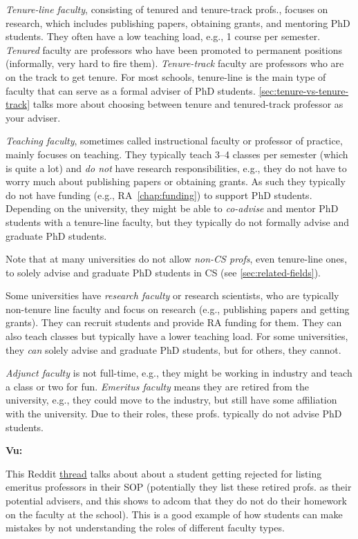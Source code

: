 \documentclass[oneside,11pt,dvipsnames]{book}
\newenvironment{commentbox}[1][]{
  \small
  \begin{mybox}
    {\small \textbf{#1}}
  }{
  \end{mybox}
}
\begin{document}
\emph{Tenure-line faculty}, consisting of tenured and tenure-track profs., focuses on research, which includes publishing papers, obtaining grants, and mentoring PhD students.  They often have a low teaching load, e.g., 1 course per semester. \emph{Tenured} faculty are professors who have been promoted to permanent positions (informally, very hard to fire them).  \emph{Tenure-track} faculty are professors who are on the track to get tenure.  For most schools, tenure-line is the main type of faculty that can serve as a formal adviser of PhD students. \autoref{sec:tenure-vs-tenure-track} talks more about choosing between tenure and tenured-track professor as your adviser.

\emph{Teaching faculty}, sometimes called instructional faculty or professor of practice, mainly focuses on teaching. They typically teach 3--4 classes per semester (which is quite a lot) and \emph{do not} have research responsibilities, e.g., they do not have to worry much about publishing papers or obtaining grants. As such they typically do not have funding (e.g., RA~\autoref{chap:funding}) to support PhD students.
Depending on the university, they might be able to \emph{co-advise} and mentor PhD students with a tenure-line faculty, but they typically do not formally advise and graduate PhD students.

Note that at many universities do not allow \emph{non-CS profs}, even tenure-line ones, to solely advise and graduate PhD students in CS (see \autoref{sec:related-fields}). 

Some universities have \emph{research faculty} or research scientists, who are typically non-tenure line faculty and focus on research (e.g., publishing papers and getting grants). 
They can recruit students and provide RA funding for them. 
They can also teach classes but typically have a lower teaching load.
For some universities, they \emph{can} solely advise and graduate PhD students, but for others, they cannot. 

\emph{Adjunct faculty} is not full-time, e.g., they might be working in industry and teach a class or two for fun. \emph{Emeritus faculty} means they are retired from the university, e.g., they could move to the industry, but still have some affiliation with the university.   Due to their roles, these profs. typically do not advise PhD students.



\begin{commentbox}[Vu:]
    This Reddit \href{https://www.reddit.com/r/gradadmissions/comments/1iyt2k8/_/}{thread} talks about about a student getting rejected for listing emeritus professors in their SOP (potentially they list these retired profs. as their potential advisers, and this shows to adcom that they do not do their homework on the faculty at the school).  This is a good example of how students can make mistakes by not understanding the roles of different faculty types.
\end{commentbox}
\end{document}
